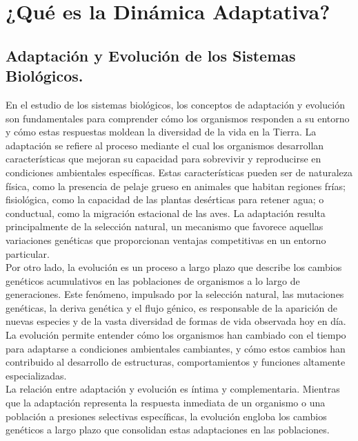 \section{¿Qué es la Dinámica Adaptativa?}{

        \subsection{Adaptación y Evolución de los Sistemas Biológicos.}{

            \normalsize{En el estudio de los sistemas biológicos, los conceptos de adaptación y evolución son fundamentales para comprender cómo los organismos responden a su entorno y cómo estas respuestas moldean la diversidad de la vida en la Tierra. \citep{adaptacion} La adaptación se refiere al proceso mediante el cual los organismos desarrollan características que mejoran su capacidad para sobrevivir y reproducirse en condiciones ambientales específicas. Estas características pueden ser de naturaleza física, como la presencia de pelaje grueso en animales que habitan regiones frías; fisiológica, como la capacidad de las plantas desérticas para retener agua; o conductual, como la migración estacional de las aves. La adaptación resulta principalmente de la selección natural, un mecanismo que favorece aquellas variaciones genéticas que proporcionan ventajas competitivas en un entorno particular.}\\

            \normalsize{\citep {evolucion} Por otro lado, la evolución es un proceso a largo plazo que describe los cambios genéticos acumulativos en las poblaciones de organismos a lo largo de generaciones. Este fenómeno, impulsado por la selección natural, las mutaciones genéticas, la deriva genética y el flujo génico, es responsable de la aparición de nuevas especies y de la vasta diversidad de formas de vida observada hoy en día. La evolución permite entender cómo los organismos han cambiado con el tiempo para adaptarse a condiciones ambientales cambiantes, y cómo estos cambios han contribuido al desarrollo de estructuras, comportamientos y funciones altamente especializadas.}\\

            \normalsize{La relación entre adaptación y evolución es íntima y complementaria. Mientras que la adaptación representa la respuesta inmediata de un organismo o una población a presiones selectivas específicas, la evolución engloba los cambios genéticos a largo plazo que consolidan estas adaptaciones en las poblaciones.}\\

}}
